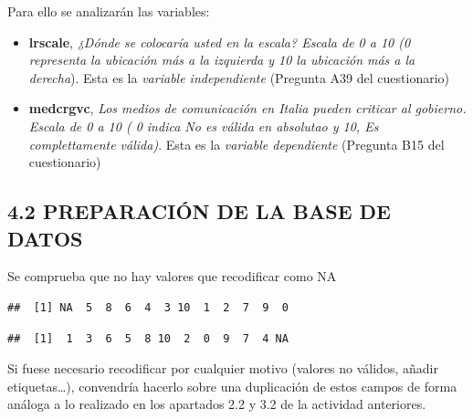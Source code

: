 \documentclass[
  12 pt,
  a4paper,
]{article}
\newenvironment{Shaded}{\begin{snugshade}}{\end{snugshade}}
\newcommand{\FunctionTok}[1]{\textcolor[rgb]{0.13,0.29,0.53}{\textbf{#1}}}
\newcommand{\NormalTok}[1]{#1}
\newcommand{\SpecialCharTok}[1]{\textcolor[rgb]{0.81,0.36,0.00}{\textbf{#1}}}
\begin{document}
Para ello se analizarán las variables:

\begin{itemize}
\item
  \textbf{lrscale}, \emph{¿Dónde se colocaría usted en la escala? Escala
  de 0 a 10 (0 representa la ubicación más a la izquierda y 10 la
  ubicación más a la derecha}). Esta es la \emph{variable independiente}
  (Pregunta A39 del cuestionario)
\item
  \textbf{medcrgvc}, \emph{Los medios de comunicación en Italia pueden
  criticar al gobierno. Escala de 0 a 10 ( 0 indica No es válida en
  absolutao y 10, Es complettamente válida)}. Esta es la \emph{variable
  dependiente} (Pregunta B15 del cuestionario)
\end{itemize}

\subsection{4.2 PREPARACIÓN DE LA BASE DE
DATOS}\label{preparaciuxf3n-de-la-base-de-datos-2}

Se comprueba que no hay valores que recodificar como NA

\begin{Shaded}
\end{Shaded}

\begin{verbatim}
##  [1] NA  5  8  6  4  3 10  1  2  7  9  0
\end{verbatim}

\begin{Shaded}
\end{Shaded}

\begin{verbatim}
##  [1]  1  3  6  5  8 10  2  0  9  7  4 NA
\end{verbatim}

Si fuese necesario recodificar por cualquier motivo (valores no válidos,
añadir etiquetas\ldots), convendría hacerlo sobre una duplicación de
estos campos de forma análoga a lo realizado en los apartados 2.2 y 3.2
de la actividad anteriores.
\end{document}
